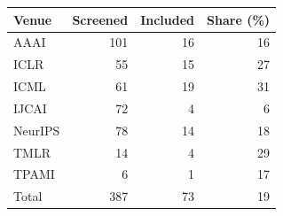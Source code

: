 \begin{tabular}{@{}lrrr@{}}
\toprule
Venue & Screened & Included & Share (\%) \\
\midrule
AAAI & 101 & 16 & 16 \\
ICLR & 55 & 15 & 27 \\
ICML & 61 & 19 & 31 \\
IJCAI & 72 & 4 & 6 \\
NeurIPS & 78 & 14 & 18 \\
TMLR & 14 & 4 & 29 \\
TPAMI & 6 & 1 & 17 \\
\midrule
Total & 387 & 73 & 19 \\
\bottomrule
\end{tabular}
